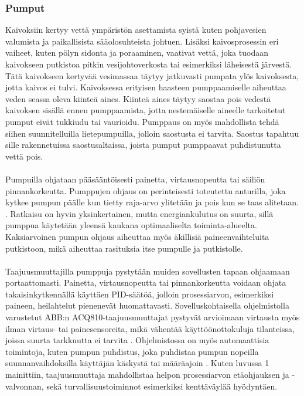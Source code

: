 \documentclass[finnish,12pt,a4paper,pdftex,elec,utf8]{aaltothesis}
\begin{document}
\subsubsection{Pumput}
Kaivoksiin kertyy vettä ympäristön asettamista syistä kuten pohjavesien valumista ja paikallisista sääolosuhteista johtuen. Lisäksi kaivosprosessin eri vaiheet, kuten pölyn sidonta ja poraaminen, vaativat vettä, joka tuodaan kaivokseen putkistoa pitkin vesijohtoverkosta tai esimerkiksi läheisestä järvestä. Tätä kaivokseen kertyvää vesimassaa täytyy jatkuvasti pumpata ylös kaivoksesta, jotta kaivos ei tulvi. Kaivoksessa erityisen haasteen pumppaamiselle aiheuttaa veden seassa oleva kiinteä aines. Kiinteä aines täytyy saostaa pois vedestä kaivoksen sisällä ennen pumppaamista, jotta nestemäiselle aineelle tarkoitetut pumput eivät tukkiudu tai vaurioidu. Pumppaus on myös mahdollista tehdä siihen suunnitelluilla lietepumpuilla, jolloin saostusta ei tarvita. Saostus tapahtuu sille rakennetuissa saostusaltaissa, joista pumput pumppaavat puhdistunutta vettä pois. \cite[s. 307]{Hakapää}
\\\\
Pumpuilla ohjataan pääsääntöisesti painetta, virtausnopeutta tai säiliön pinnankorkeutta. Pumppujen ohjaus on perinteisesti toteutettu anturilla, joka kytkee pumpun päälle kun tietty raja-arvo ylitetään ja pois kun se taas alitetaan. \cite[s. 315]{Hakapää}. Ratkaisu on hyvin yksinkertainen, mutta energiankulutus on suurta, sillä pumppua käytetään yleensä kaukana optimaaliselta toiminta-alueelta. Kaksiarvoinen pumpun ohjaus aiheuttaa myös äkillisiä paineenvaihteluita putkistoon, mikä aiheuttaa rasituksia itse pumpulle ja putkistolle.
\\\\
Taajuusmuuttajilla pumppuja pystytään muiden sovellusten tapaan ohjaamaan portaattomasti. Painetta, virtausnopeutta tai pinnankorkeutta voidaan ohjata takaisinkytkennällä käyttäen PID-säätöä, jolloin prosessiarvon, esimerkiksi paineen, heilahtelut pienenevät huomattavasti. Sovelluskohtaisella ohjelmistolla varustetut ABB:n ACQ810-taajuusmuuttajat pystyvät arvioimaan virtausta myös ilman virtaus- tai painesensoreita, mikä vähentää käyttöönottokuluja tilanteissa, joissa suurta tarkkuutta ei tarvita \cite{ACQ810}. Ohjelmistossa on myös automaattisia toimintoja, kuten pumpun puhdistus, joka puhdistaa pumpun nopeilla suunnanvaihdoksilla käyttäjän käskystä tai määräajoin \cite{ACQ810}. Kuten luvussa 1 mainittiin, taajuusmuuttaja mahdollistaa helpon prosessiarvon etäohjauksen ja -valvonnan, sekä turvallisuustoiminnot esimerkiksi kenttäväylää hyödyntäen.
\end{document}
